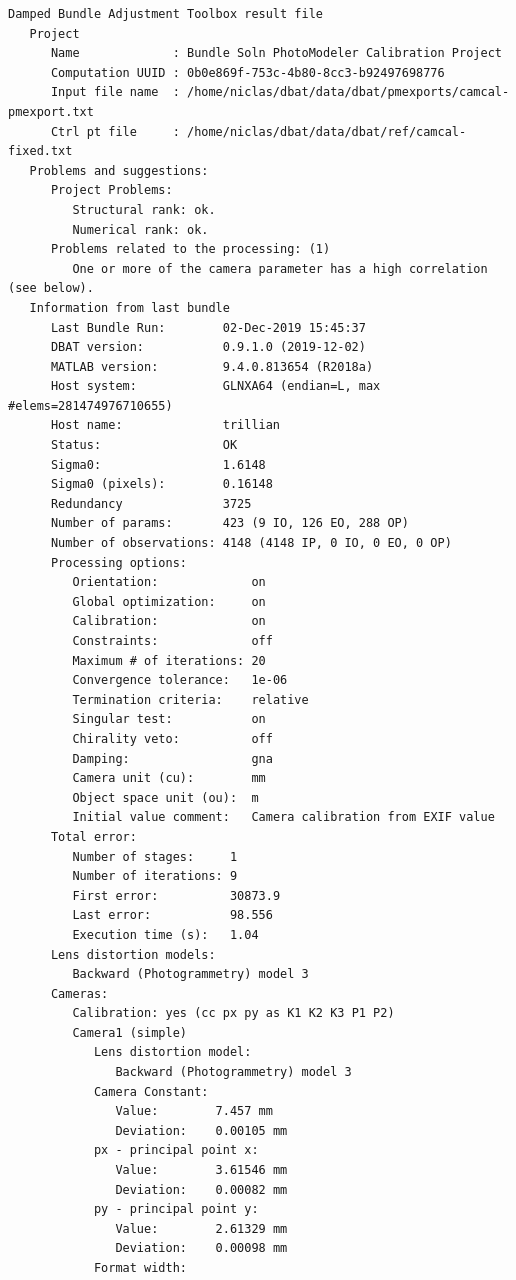 \documentclass{article}
\begin{document}
\begin{verbatim}
Damped Bundle Adjustment Toolbox result file
   Project
      Name             : Bundle Soln PhotoModeler Calibration Project
      Computation UUID : 0b0e869f-753c-4b80-8cc3-b92497698776
      Input file name  : /home/niclas/dbat/data/dbat/pmexports/camcal-pmexport.txt
      Ctrl pt file     : /home/niclas/dbat/data/dbat/ref/camcal-fixed.txt
   Problems and suggestions:
      Project Problems:
         Structural rank: ok.
         Numerical rank: ok.
      Problems related to the processing: (1)
         One or more of the camera parameter has a high correlation (see below).
   Information from last bundle
      Last Bundle Run:        02-Dec-2019 15:45:37
      DBAT version:           0.9.1.0 (2019-12-02)
      MATLAB version:         9.4.0.813654 (R2018a)
      Host system:            GLNXA64 (endian=L, max #elems=281474976710655)
      Host name:              trillian
      Status:                 OK
      Sigma0:                 1.6148
      Sigma0 (pixels):        0.16148
      Redundancy              3725
      Number of params:       423 (9 IO, 126 EO, 288 OP)
      Number of observations: 4148 (4148 IP, 0 IO, 0 EO, 0 OP)
      Processing options:
         Orientation:             on
         Global optimization:     on
         Calibration:             on
         Constraints:             off
         Maximum # of iterations: 20
         Convergence tolerance:   1e-06
         Termination criteria:    relative
         Singular test:           on
         Chirality veto:          off
         Damping:                 gna
         Camera unit (cu):        mm
         Object space unit (ou):  m
         Initial value comment:   Camera calibration from EXIF value
      Total error:
         Number of stages:     1
         Number of iterations: 9
         First error:          30873.9
         Last error:           98.556
         Execution time (s):   1.04
      Lens distortion models:
         Backward (Photogrammetry) model 3
      Cameras:
         Calibration: yes (cc px py as K1 K2 K3 P1 P2)
         Camera1 (simple)
            Lens distortion model:
               Backward (Photogrammetry) model 3
            Camera Constant:
               Value:        7.457 mm
               Deviation:    0.00105 mm
            px - principal point x:
               Value:        3.61546 mm
               Deviation:    0.00082 mm
            py - principal point y:
               Value:        2.61329 mm
               Deviation:    0.00098 mm
            Format width:

\end{verbatim}
\end{document}
